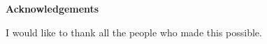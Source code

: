 
\begin{center}\textbf{Acknowledgements}\end{center}

I would like to thank all the people who made this possible.

\cleardoublepage



